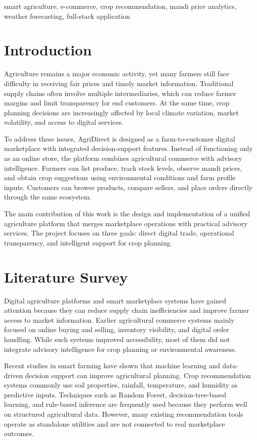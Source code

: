 \documentclass[conference]{IEEEtran}
\begin{document}
\begin{IEEEkeywords}
smart agriculture, e-commerce, crop recommendation, mandi price analytics, weather forecasting, full-stack application
\end{IEEEkeywords}

\section{Introduction}
Agriculture remains a major economic activity, yet many farmers still face difficulty in receiving fair prices and timely market information. Traditional supply chains often involve multiple intermediaries, which can reduce farmer margins and limit transparency for end customers. At the same time, crop planning decisions are increasingly affected by local climate variation, market volatility, and access to digital services.

To address these issues, AgriDirect is designed as a farm-to-customer digital marketplace with integrated decision-support features. Instead of functioning only as an online store, the platform combines agricultural commerce with advisory intelligence. Farmers can list produce, track stock levels, observe mandi prices, and obtain crop suggestions using environmental conditions and farm profile inputs. Customers can browse products, compare sellers, and place orders directly through the same ecosystem.

The main contribution of this work is the design and implementation of a unified agriculture platform that merges marketplace operations with practical advisory services. The project focuses on three goals: direct digital trade, operational transparency, and intelligent support for crop planning.

\section{Literature Survey}
Digital agriculture platforms and smart marketplace systems have gained attention because they can reduce supply chain inefficiencies and improve farmer access to market information. Earlier agricultural commerce systems mainly focused on online buying and selling, inventory visibility, and digital order handling. While such systems improved accessibility, most of them did not integrate advisory intelligence for crop planning or environmental awareness.

Recent studies in smart farming have shown that machine learning and data-driven decision support can improve agricultural planning. Crop recommendation systems commonly use soil properties, rainfall, temperature, and humidity as predictive inputs. Techniques such as Random Forest, decision-tree-based learning, and rule-based inference are frequently used because they perform well on structured agricultural data. However, many existing recommendation tools operate as standalone utilities and are not connected to real marketplace outcomes.
\end{document}
